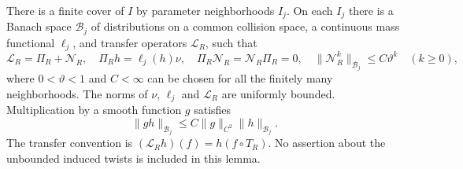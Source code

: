 \begin{lemma}
\label{lem:collision-spectral-input}
There is a finite cover of $I$ by parameter neighborhoods $I_j$. On each
$I_j$ there is a Banach space $\mathcal B_j$ of distributions on a common
collision space, a continuous mass functional $\ell_j$, and transfer
operators $\mathcal L_R$, such that
\begin{equation}\label{eq:collision-split}
 \mathcal L_R=\Pi_R+\mathcal N_R,\quad
 \Pi_R h=\ell_j(h)\nu,\quad
 \Pi_R\mathcal N_R=\mathcal N_R\Pi_R=0,\quad
 \|\mathcal N_R^k\|_{\mathcal B_j}\le C\vartheta^k
 \quad(k\ge0),
\end{equation}
where $0<\vartheta<1$ and $C<\infty$ can be chosen for all the finitely
many neighborhoods. The norms of $\nu$, $\ell_j$ and $\mathcal L_R$ are
uniformly bounded. Multiplication by a smooth function $g$ satisfies
\begin{equation}\label{eq:smooth-multiplier}
 \|g h\|_{\mathcal B_j}\le C\|g\|_{C^2}\|h\|_{\mathcal B_j}.
\end{equation}
The transfer convention is $(\mathcal L_R h)(f)=h(f\circ T_R)$.
No assertion about the unbounded induced twists is included in this lemma.
\end{lemma}
